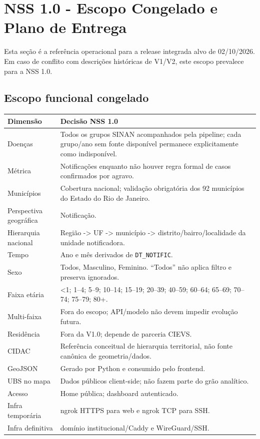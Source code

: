 \section{NSS 1.0 - Escopo Congelado e Plano de Entrega}

Esta seção é a referência operacional para a release integrada alvo de 02/10/2026. Em caso de conflito com descrições históricas de V1/V2, este escopo prevalece para a NSS 1.0.

\subsection{Escopo funcional congelado}

\begin{longtable}{p{4.2cm}p{10.4cm}}
\toprule
\textbf{Dimensão} & \textbf{Decisão NSS 1.0} \\
\midrule
Doenças & Todos os grupos SINAN acompanhados pela pipeline; cada grupo/ano sem fonte disponível permanece explicitamente como indisponível. \\
Métrica & Notificações enquanto não houver regra formal de casos confirmados por agravo. \\
Municípios & Cobertura nacional; validação obrigatória dos 92 municípios do Estado do Rio de Janeiro. \\
Perspectiva geográfica & Notificação. \\
Hierarquia nacional & Região -> UF -> município -> distrito/bairro/localidade da unidade notificadora. \\
Tempo & Ano e mês derivados de \texttt{DT\_NOTIFIC}. \\
Sexo & Todos, Masculino, Feminino. ``Todos'' não aplica filtro e preserva ignorados. \\
Faixa etária & <1; 1--4; 5--9; 10--14; 15--19; 20--39; 40--59; 60--64; 65--69; 70--74; 75--79; 80+. \\
Multi-faixa & Fora do escopo; API/modelo não devem impedir evolução futura. \\
Residência & Fora da V1.0; depende de parceria CIEVS. \\
CIDAC & Referência conceitual de hierarquia territorial, não fonte canônica de geometria/dados. \\
GeoJSON & Gerado por Python e consumido pelo frontend. \\
UBS no mapa & Dados públicos client-side; não fazem parte do grão analítico. \\
Acesso & Home pública; dashboard autenticado. \\
Infra temporária & ngrok HTTPS para web e ngrok TCP para SSH. \\
Infra definitiva & domínio institucional/Caddy e WireGuard/SSH. \\
\bottomrule
\end{longtable}


